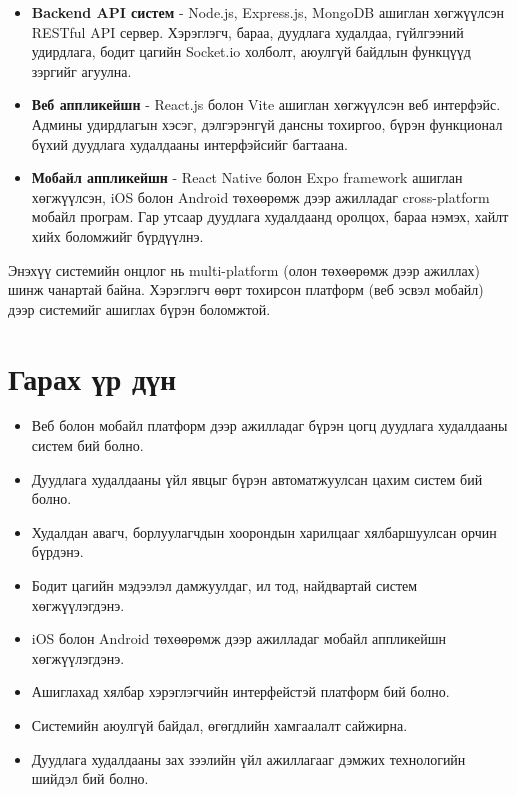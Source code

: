 \begin{itemize}
    \item \textbf{Backend API систем} - Node.js, Express.js, MongoDB ашиглан хөгжүүлсэн RESTful API сервер. Хэрэглэгч, бараа, дуудлага худалдаа, гүйлгээний удирдлага, бодит цагийн Socket.io холболт, аюулгүй байдлын функцүүд зэргийг агуулна.
    \item \textbf{Веб аппликейшн} - React.js болон Vite ашиглан хөгжүүлсэн веб интерфэйс. Админы удирдлагын хэсэг, дэлгэрэнгүй дансны тохиргоо, бүрэн функционал бүхий дуудлага худалдааны интерфэйсийг багтаана.
    \item \textbf{Мобайл аппликейшн} - React Native болон Expo framework ашиглан хөгжүүлсэн, iOS болон Android төхөөрөмж дээр ажилладаг cross-platform мобайл програм. Гар утсаар дуудлага худалдаанд оролцох, бараа нэмэх, хайлт хийх боломжийг бүрдүүлнэ.
\end{itemize}

Энэхүү системийн онцлог нь multi-platform (олон төхөөрөмж дээр ажиллах) шинж чанартай байна. Хэрэглэгч өөрт тохирсон платформ (веб эсвэл мобайл) дээр системийг ашиглах бүрэн боломжтой.

\section{Гарах үр дүн}
\begin{itemize}
    \item Веб болон мобайл платформ дээр ажилладаг бүрэн цогц дуудлага худалдааны систем бий болно.
    \item Дуудлага худалдааны үйл явцыг бүрэн автоматжуулсан цахим систем бий болно.
    \item Худалдан авагч, борлуулагчдын хоорондын харилцааг хялбаршуулсан орчин бүрдэнэ.
    \item Бодит цагийн мэдээлэл дамжуулдаг, ил тод, найдвартай систем хөгжүүлэгдэнэ.
    \item iOS болон Android төхөөрөмж дээр ажилладаг мобайл аппликейшн хөгжүүлэгдэнэ.
    \item Ашиглахад хялбар хэрэглэгчийн интерфейстэй платформ бий болно.
    \item Системийн аюулгүй байдал, өгөгдлийн хамгаалалт сайжирна.
    \item Дуудлага худалдааны зах зээлийн үйл ажиллагааг дэмжих технологийн шийдэл бий болно.
\end{itemize}